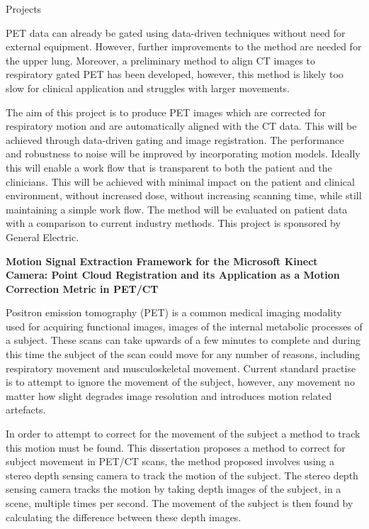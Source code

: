 \documentclass{cv}
\begin{document}
\begin{rSection}{Projects}
\item PET data can already be gated using data-driven techniques without need for external equipment. However, further improvements to the method are needed for the upper lung. Moreover, a preliminary method to align CT images to respiratory gated PET has been developed, however, this method is likely too slow for clinical application and struggles with larger movements.

\item The aim of this project is to produce PET images which are corrected for respiratory motion and are automatically aligned with the CT data. This will be achieved through data-driven gating and image registration. The performance and robustness to noise will be improved by incorporating motion models. Ideally this will enable a work flow that is transparent to both the patient and the clinicians. This will be achieved with minimal impact on the patient and clinical environment, without increased dose, without increasing scanning time, while still maintaining a simple work flow. The method will be evaluated on patient data with a comparison to current industry methods. This project is sponsored by General Electric.


{\bf Motion Signal Extraction Framework for the Microsoft Kinect Camera: Point Cloud Registration and its Application as a Motion Correction Metric in PET/CT} \hfill {\em} 
\item Positron emission tomography (PET) is a common medical imaging modality used for acquiring functional images, images of the internal metabolic processes of a subject. These scans can take upwards of a few minutes to complete and during this time the subject of the scan could move for any number of reasons, including respiratory movement and musculoskeletal movement. Current standard practise is to attempt to ignore the movement of the subject, however, any movement no matter how slight degrades image resolution and introduces motion related artefacts.

\item In order to attempt to correct for the movement of the subject a method to track this motion must be found. This dissertation proposes a method to correct for subject movement in PET/CT scans, the method proposed involves using a stereo depth sensing camera to track the motion of the subject. The stereo depth sensing camera tracks the motion by taking depth images of the subject, in a scene, multiple times per second. The movement of the subject is then found by calculating the difference between these depth images.


\end{rSection}
\end{document}
